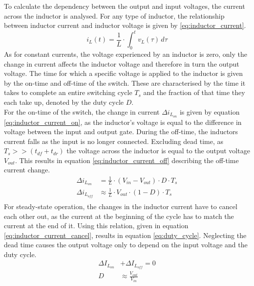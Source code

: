 To calculate the dependency between the output and input voltages, the current across the inductor is analysed. For any type of inductor, the relationship between inductor current and inductor voltage is given by \ref{eq:inductor_current}.
\begin{equation}\label{eq:inductor_current}
    i_L(t) = \frac{1}{L} \cdot \int_{0}^{t} v_L(\tau) \,d\tau
\end{equation}
As for constant currents, the voltage experienced by an inductor is zero, only the change in current affects the inductor voltage and therefore in turn the output voltage. The time for which a specific voltage is applied to the inductor is given by the on-time and off-time of the switch. These are characterised by the time it takes to complete an entire switching cycle $T_s$ and the fraction of that time they each take up, denoted by the duty cycle $D$.\\
For the on-time of the switch, the change in current $\Delta i_{L_{on}}$ is given by equation \ref{eq:inductor_current_on}, as the inductor's voltage is equal to the difference in voltage between the input and output gate. During the off-time, the inductors current falls as the input is no longer connected. Excluding dead time, as $T_s >> (t_{df} + t_{dr})$ the voltage across the inductor is equal to the output voltage $V_{out}$. This results in equation \ref{eq:inductor_current_off} describing the off-time current change. 
\begin{align}
    \Delta i_{L_{on}} &= \frac{1}{L} \cdot (V_{in} - V_{out}) \cdot D \cdot T_{s}       \label{eq:inductor_current_on}\\
    \Delta i_{L_{off}} &\approx \frac{1}{L} \cdot V_{out} \cdot (1-D) \cdot T_{s}     \label{eq:inductor_current_off}\\
\end{align}
For steady-state operation, the changes in the inductor current have to cancel each other out, as the current at the beginning of the cycle has to match the current at the end of it. Using this relation, given in equation \ref{eq:inductor_current_cancel}, results in equation \ref{eq:duty_cycle}. Neglecting the dead time causes the output voltage only to depend on the input voltage and the duty cycle. 
\begin{align}
    \Delta I_{L_{on}} &+ \Delta I_{L_{off}} = 0                                         \label{eq:inductor_current_cancel}\\
    D &\approx \frac{V_{out}}{V_{in}} 
        \label{eq:duty_cycle}
\end{align}


